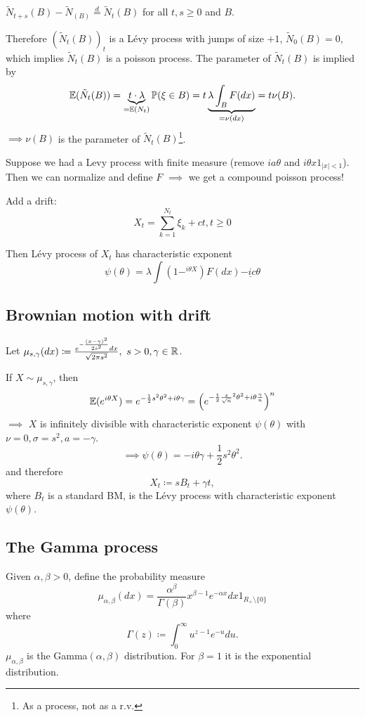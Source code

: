 $\tilde{N}_{t+s}(B)-\tilde{N}_(B)\stackrel{d}{=}\tilde{N}_t(B)$ for all $t,s\geq 0$ and $B$.

Therefore $(\tilde{N}_t(B))_t$ is a Lévy process with jumps of size $+1$, $\tilde{N}_0(B)=0$, which implies $\tilde{N}_t(B)$ is a poisson process.
The parameter of $\tilde{N}_t(B)$ is implied by\[\mathbb{E}(\tilde{N}_t(B))=\underbrace{t\cdot \lambda}_{=\mathbb{E}(N_t)}\mathbb{P}(\xi\in B)=t\underbrace{\lambda\int_B F(dx)}_{=\nu(dx)}=t\nu(B).\]
$\implies \nu(B)$ is the parameter of $\tilde{N}_t(B)$\footnote{As a process, not as a r.v.}.

\begin{aremark}
    Suppose we had a Levy process with finite measure (remove $ia\theta$ and $i\theta x1_{|x|<1}$). Then we can 
    normalize and define $F$ $\implies$ we get a compound poisson process!
\end{aremark}

Add a drift: 
\[X_t=\sum_{k=1}^{N_t}\xi_k+ct,t\geq 0\]

Then Lévy process of $X_t$ has characteristic exponent 
\[\psi(\theta)=\lambda\int (1-^{i\theta X})F(dx)\underline{-ic\theta}\]

\subsection{Brownian motion with drift}

Let $\mu_{s,\gamma}(dx)\coloneqq \frac{e^{-\frac{(x-\gamma)^2}{2s^2}}dx}{\sqrt{2\pi s^2}}, \text{ } s>0,\gamma\in\mathbb{R}$.

If $X\sim \mu_{s,\gamma}$, then 
\[\mathbb{E}(e^{i\theta X})=e^{-\frac{1}{2}s^2\theta^2+i\theta \gamma}=\left(e^{-\frac{1}{2}\frac{s}{\sqrt{n}}^2\theta^2+i\theta \frac{\gamma}{n}}\right)^n\]
$\implies$ $X$ is infinitely divisible with characteristic exponent $\psi(\theta)$ with 
$\nu=0,\sigma=s^2,a=-\gamma$.
\[\implies \psi(\theta)=-i\theta\gamma +\frac{1}{2}s^2\theta^2.\]
and therefore \[X_t\coloneqq s B_t+\gamma t,\]
where $B_t$ is a standard BM, is the Lévy process with characteristic exponent $\psi(\theta)$.


\subsection{The Gamma process}


Given $\alpha,\beta>0$, define the probability measure 
\[\mu_{\alpha,\beta}(dx)=\frac{\alpha^\beta}{\Gamma(\beta)}x^{\beta-1}e^{-\alpha x}dx 1_{R_+\setminus\{0\}}\]
where \[\Gamma(z)\coloneqq \int_0^\infty u^{z-1}e^{-u}du.\]
$\mu_{\alpha,\beta}$ is the Gamma$(\alpha,\beta)$ distribution. For $\beta=1$ it is the exponential distribution.

